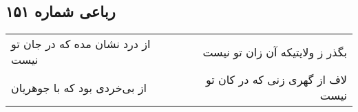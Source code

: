 \begin{center}
\section*{رباعی شماره ۱۵۱}
\label{sec:sh151}
\begin{longtable}{l p{0.5cm} r}
از درد نشان مده که در جان تو نیست
&&
بگذر ز ولایتیکه آن زان تو نیست
\\
از بی‌خردی بود که با جوهریان
&&
لاف از گهری زنی که در کان تو نیست
\\
\end{longtable}
\end{center}

